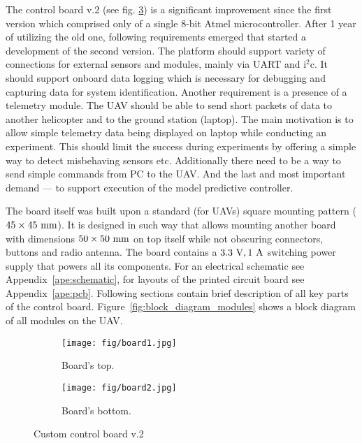 The control board v.2 (see fig. \ref{fig:custom_board}) is a significant improvement since the first version \citep{baca2013} which comprised only of a single 8-bit Atmel microcontroller. After 1 year of utilizing the old one, following requirements emerged that started a development of the second version. The platform should support variety of connections for external sensors and modules, mainly via UART and $\mathrm{i}^2\mathrm{c}$. It should support onboard data logging which is necessary for debugging and capturing data for system identification. Another requirement is a presence of a telemetry module. The UAV should be able to send short packets of data to another helicopter and to the ground station (laptop). The main motivation is to allow simple telemetry data being displayed on laptop while conducting an experiment. This should limit the success during experiments by offering a simple way to detect misbehaving sensors etc. Additionally there need to be a way to send simple commands from PC to the UAV. And the last and most important demand --- to support execution of the model predictive controller.

The board itself was built upon a standard (for UAVs) square mounting pattern ($45\times 45~\mathrm{mm}$). It is designed in such way that allows mounting another board with dimensions $50\times 50~\mathrm{mm}$ on top itself while not obscuring connectors, buttons and radio antenna. The board contains a $3.3~\mathrm{V}, 1~\mathrm{A}$ switching power supply that powers all its components. For an electrical schematic see Appendix~\ref{ape:schematic}, for layouts of the printed circuit board see Appendix~\ref{ape:pcb}. Following sections contain brief description of all key parts of the control board. Figure~\ref{fig:block_diagram_modules} shows a block diagram of all modules on the UAV.

\begin{figure}[htbp]
\centering

\begin{subfigure}[b]{0.515\textwidth}
	\texttt{[image: fig/board1.jpg]}
	\caption{Board's top.}
	\label{fig:board_top}
\end{subfigure}%
\begin{subfigure}[b]{0.485\textwidth}
	\texttt{[image: fig/board2.jpg]}
	\caption{Board's bottom.}
	\label{fig:board_bottom}
\end{subfigure}

\caption{Custom control board v.2}
\label{fig:custom_board}
\end{figure}

